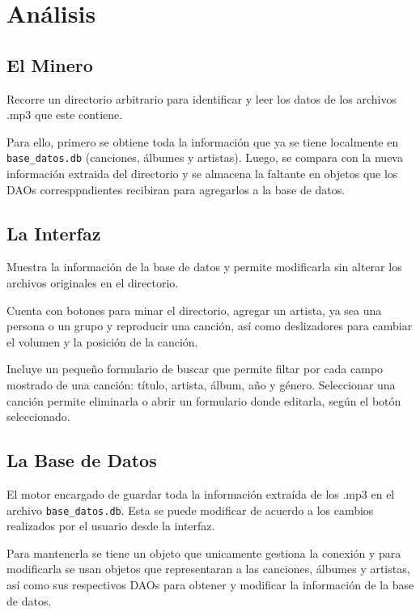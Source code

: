 \documentclass[12pt]{article}  %
\begin{document}
\section{Análisis}

\subsection{El Minero}

Recorre un directorio arbitrario para identificar y leer los datos de los
archivos .mp3 que este contiene.

Para ello, primero se obtiene toda la información que ya se tiene localmente en
\texttt{base\_datos.db} (canciones, álbumes y artistas). Luego, se compara con
la nueva información extraida del directorio y se almacena la faltante en
objetos que los DAOs corresppndientes recibiran para agregarlos a la base de datos.

\subsection{La Interfaz}

Muestra la información de la base de datos y permite modificarla sin alterar los
archivos originales en el directorio.

Cuenta con botones para minar el directorio, agregar un artista, ya sea una
persona o un grupo y reproducir una canción, así como deslizadores para cambiar
el volumen y la posición de la canción.

Incluye un pequeño formulario de buscar que permite filtar por cada campo
mostrado de una canción: título, artista, álbum, año y género. Seleccionar una
canción permite eliminarla o abrir un formulario donde editarla, según el
botón seleccionado.

\subsection{La Base de Datos}

El motor encargado de guardar toda la información extraída de los .mp3 en
el archivo \texttt{base\_datos.db}. Esta se puede modificar de acuerdo a los cambios
realizados por el usuario desde la interfaz.

Para mantenerla se tiene un objeto que unicamente gestiona la conexión y para
modificarla se usan objetos que representaran a las canciones, álbumes y
artistas, así como sus respectivos DAOs para obtener y modificar la información
de la base de datos.
\end{document}
